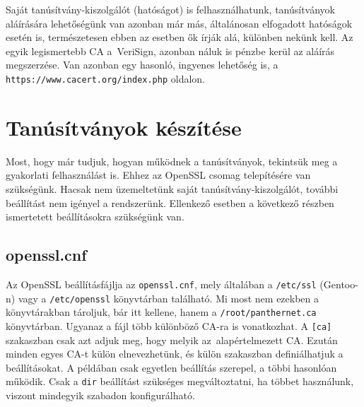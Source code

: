 Saját tanúsítvány-kiszolgálót (hatóságot) is felhasználhatunk, tanúsítványok aláírására lehetőségünk van azonban már
más, általánosan elfogadott hatóságok esetén is, természetesen ebben az esetben ők írják alá, különben nekünk kell. Az
egyik legismertebb CA a~VeriSign, azonban náluk is pénzbe kerül az aláírás megszerzése. Van azonban egy hasonló,
ingyenes lehetőség is, a \texttt{https://www.cacert.org/index.php} oldalon.

\section{Tanúsítványok készítése}
Most, hogy már tudjuk, hogyan működnek a tanúsítványok, tekintsük meg a gyakorlati felhasználást is. Ehhez az OpenSSL
csomag telepítésére van szükségünk. Hacsak nem üzemeltetünk saját tanúsítvány-kiszolgálót, további beállítást nem
igényel a rendszerünk. Ellenkező esetben a következő részben ismertetett beállításokra szükségünk van.

\subsection{openssl.cnf}
Az OpenSSL beállításfájlja az \texttt{openssl.cnf}, mely általában a \texttt{/etc/ssl} (Gentoo-n) vagy a
\texttt{/etc/openssl} könyvtárban található. Mi most nem
ezekben a könyvtárakban tároljuk, bár itt kellene, hanem a \texttt{/root/panthernet.ca} könyvtárban. Ugyanaz a fájl több
különböző CA-ra is vonatkozhat. A \texttt{[ca]} szakaszban csak azt adjuk meg, hogy melyik az~alapértelmezett CA. Ezután
minden egyes CA-t külön elnevezhetünk, és külön szakaszban definiálhatjuk a beállításokat. A példában csak egyetlen
beállítás szerepel, a többi hasonlóan működik. Csak a \texttt{dir} beállítást szükséges megváltoztatni, ha többet
használunk, viszont mindegyik szabadon konfigurálható.

